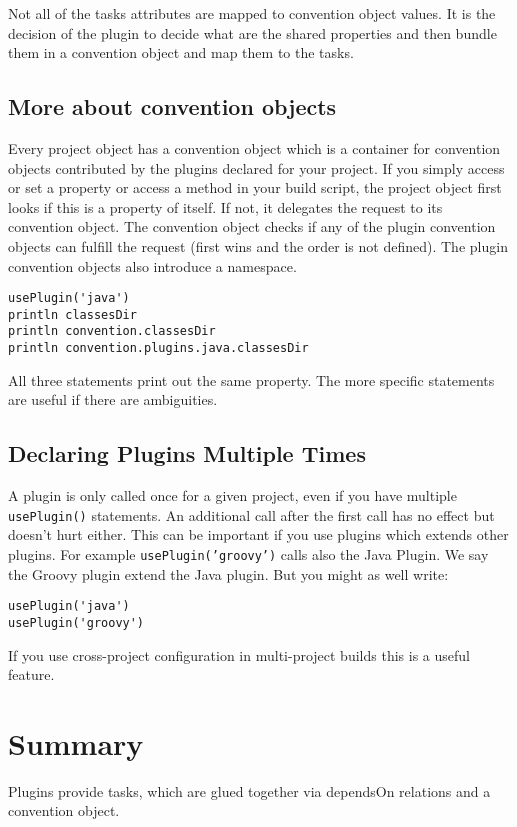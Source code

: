 Not all of the tasks attributes are mapped to convention object values. It is the decision of the plugin to decide what are the shared properties and then bundle them in a convention object and map them to the tasks.

\subsection{More about convention objects} %
\label{sub:more_about_convention_objects}
Every project object has a convention object which is a container for convention objects contributed by the plugins declared for your project. If you simply access or set a property or access a method in your build script, the project object first looks if this is a property of itself. If not, it delegates the request to its convention object. The convention object checks if any of the plugin convention objects can fulfill the request (first wins and the order is not defined). The plugin convention objects also introduce a namespace.   
\begin{Verbatim}
usePlugin('java')
println classesDir
println convention.classesDir
println convention.plugins.java.classesDir
\end{Verbatim}   
All three statements print out the same property. The more specific statements are useful if there are ambiguities.  

\subsection{Declaring Plugins Multiple Times} %
\label{sub:declaring_plugins_multiple_times}
A plugin is only called once for a given project, even if you have multiple \texttt{usePlugin()} statements. An additional call after the first call has no effect but doesn't hurt either. This can be important if you use plugins which extends other plugins. For example \texttt{usePlugin('groovy')} calls also the Java Plugin. We say the Groovy plugin extend the Java plugin. But you might as well write:
\begin{Verbatim}
usePlugin('java')
usePlugin('groovy')
\end{Verbatim}
If you use cross-project configuration in multi-project builds this is a useful feature.

\section{Summary} %
\label{sec:summary}
Plugins provide tasks, which are glued together via dependsOn relations and a convention object. 
